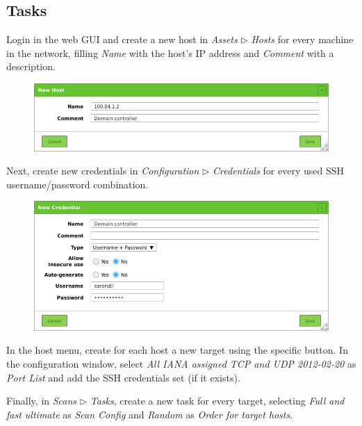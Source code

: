 \documentclass{homework}
\begin{document}
    \subsection{Tasks}
    Login in the web GUI and create a new host in \textit{Assets} $\triangleright$ \textit{Hosts} for every machine in the network, filling \textit{Name} with the host's IP address and \textit{Comment} with a description.
    \vspace{-5pt}
    \begin{figure}[H]
        \centering
        \includegraphics[width=1\linewidth]{images/new-host}
        \label{fig:new-host}
    \end{figure}
    \vspace{-20pt}
    
    Next, create new credentials in \textit{Configuration} $\triangleright$ \textit{Credentials} for every used SSH username/password combination.
    \vspace{-5pt}
    \begin{figure}[H]
        \centering
        \includegraphics[width=1\linewidth]{images/new-credentials}
        \label{fig:new-credentials}
    \end{figure}
    \vspace{-20pt}
    
    In the host menu, create for each host a new target using the specific button.
    In the configuration window, select \textit{All IANA assigned TCP and UDP 2012-02-20} as \textit{Port List} and add the SSH credentials set (if it exists).
    
    Finally, in \textit{Scans} $\triangleright$ \textit{Tasks}, create a new task for every target, selecting \textit{Full and fast ultimate} as \textit{Scan Config} and \textit{Random} as \textit{Order for target hosts}.
    
\end{document}
